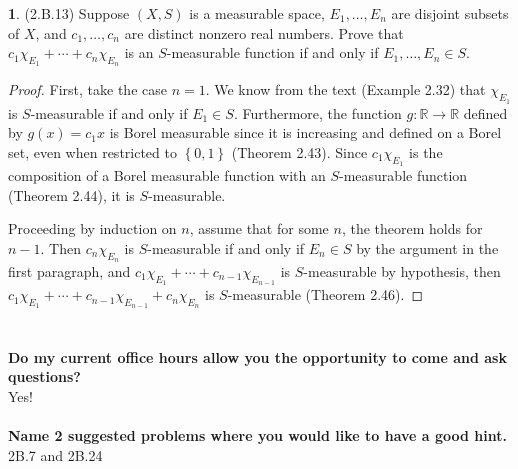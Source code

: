 \documentclass[12pt]{article}
\theoremstyle{definition}
\newtheorem{ex}{}
\begin{document}
\begin{ex}
	(2.B.13)
	Suppose $(X, S)$ is a measurable space, $E_1, \dots, E_n$ are disjoint subsets of $X$, and $c_1, \dots, c_n$ are distinct nonzero real numbers.
	Prove that $c_1 \chi_{E_1} + \cdots + c_n\chi_{E_n}$ is an $S$-measurable function if and only if $E_1, \dots, E_n \in S$.
\end{ex}
\begin{proof}
	First, take the case $n = 1$.
	We know from the text (Example 2.32) that $\chi_{E_1}$ is $S$-measurable if and only if $E_1 \in S$.
	Furthermore, the function $g : \mathbb{R} \to \mathbb{R}$ defined by $g(x)=c_1x$ is Borel measurable since it is increasing and defined on a Borel set, even when restricted to $\left\lbrace 0, 1 \right\rbrace$ (Theorem 2.43).
	Since $c_1\chi_{E_1}$ is the composition of a Borel measurable function with an $S$-measurable function (Theorem 2.44), it is $S$-measurable.

	Proceeding by induction on $n$, assume that for some $n$, the theorem holds for $n-1$.
	Then $c_n\chi_{E_n}$ is $S$-measurable if and only if $E_n \in S$ by the argument in the first paragraph, and $c_1\chi_{E_1} + \cdots + c_{n-1}\chi_{E_{n-1}}$ is $S$-measurable by hypothesis, then $c_1\chi_{E_1} + \cdots + c_{n-1}\chi_{E_{n-1}} + c_n\chi_{E_n}$ is $S$-measurable (Theorem 2.46).
\end{proof}

\section*{}

\textbf{Do my current office hours allow you the opportunity to come and ask questions?}\\
Yes!
\\\\
\textbf{Name 2 suggested problems where you would like to have a good hint.}\\
2B.7 and 2B.24
\\\\
\end{document}
